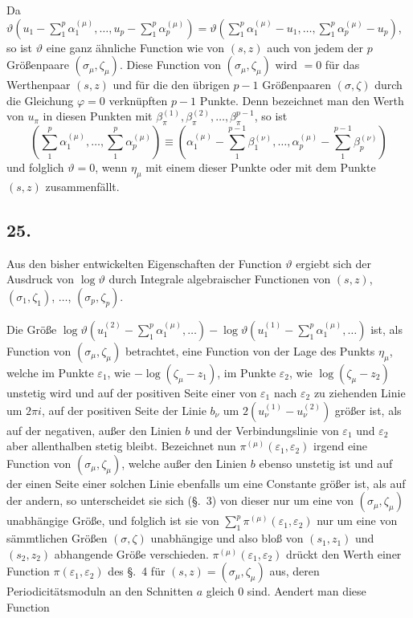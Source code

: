 \documentclass{article}
\begin{document}
Da $\vartheta\left(u_{1} - \displaystyle\sum_{1}^{p} \alpha_{1}^{(\mu)}, \ldots, u_{p} - \sum_{1}^{p} \alpha_{p}^{(\mu)}\right) = \vartheta\left(\displaystyle\sum_{1}^{p} \alpha_{1}^{(\mu)} - u_{1}, \ldots, \sum_{1}^{p} \alpha_{p}^{(\mu)} - u_{p}\right)$, so ist $\vartheta$ eine ganz ähnliche Function wie von $(s, z)$ auch von jedem der $p$ Größenpaare $(\sigma_{\mu}, \zeta_{\mu})$. Diese Function von $(\sigma_{\mu}, \zeta_{\mu})$ wird $= 0$ für das Werthenpaar $(s, z)$ und für die den übrigen $p-1$ Größenpaaren $(\sigma, \zeta)$ durch die Gleichung $\varphi = 0$ verknüpften $p-1$ Punkte. Denn bezeichnet man den Werth von $u_{\pi}$ in diesen Punkten mit $\beta_{\pi}^{(1)}, \beta_{\pi}^{(2)}, \ldots, \beta_{\pi}^{p-1}$, so ist
\[ \left(\sum_{1}^{p} \alpha_{1}^{(\mu)}, \ldots, \sum_{1}^{p} \alpha_{p}^{(\mu)}\right) \equiv \left(\alpha_{1}^{(\mu)} - \sum_{1}^{p-1} \beta_{1}^{(\nu)}, \ldots, \alpha_{p}^{(\mu)} - \sum_{1}^{p-1} \beta_{p}^{(\nu)}\right) \]
und folglich $\vartheta = 0$, wenn $\eta_{\mu}$ mit einem dieser Punkte oder mit dem Punkte $(s, z)$ zusammenfällt.

\subsection*{25.}

Aus den bisher entwickelten Eigenschaften der Function $\vartheta$ ergiebt sich der Ausdruck von $\log\vartheta$ durch Integrale algebraischer Functionen von $(s, z)$, $(\sigma_{1}, \zeta_{1})$, $\ldots$, $(\sigma_{p}, \zeta_{p})$.

Die Größe $\log\vartheta\left(u_{1}^{(2)} - \displaystyle\sum_{1}^{p} \alpha_{1}^{(\mu)}, \ldots\right) - \log\vartheta\left(u_{1}^{(1)} - \displaystyle\sum_{1}^{p} \alpha_{1}^{(\mu)}, \ldots\right)$ ist, als Function von $(\sigma_{\mu}, \zeta_{\mu})$ betrachtet, eine Function von der Lage des Punkts $\eta_{\mu}$, welche im Punkte $\varepsilon_{1}$, wie $-\log(\zeta_{\mu}-z_{1})$, im Punkte $\varepsilon_{2}$, wie $\log(\zeta_{\mu}-z_{2})$ unstetig wird und auf der positiven Seite einer von $\varepsilon_{1}$ nach $\varepsilon_{2}$ zu ziehenden Linie um $2\pi i$, auf der positiven Seite der Linie $b_{\nu}$ um $2(u_{\nu}^{(1)} - u_{\nu}^{(2)})$ größer ist, als auf der negativen, außer den Linien $b$ und der Verbindungslinie von $\varepsilon_{1}$ und $\varepsilon_{2}$ aber allenthalben stetig bleibt. Bezeichnet nun $\pi^{(\mu)}(\varepsilon_{1}, \varepsilon_{2})$ irgend eine Function von $(\sigma_{\mu}, \zeta_{\mu})$, welche außer den Linien $b$ ebenso unstetig ist und auf der einen Seite einer solchen Linie ebenfalls um eine Constante größer ist, als auf der andern, so unterscheidet sie sich (§.~3) von dieser nur um eine von $(\sigma_{\mu}, \zeta_{\mu})$ unabhängige Größe, und folglich ist sie von $\displaystyle\sum_{1}^{p} \pi^{(\mu)}(\varepsilon_{1}, \varepsilon_{2})$ nur um eine von sämmtlichen Größen $(\sigma, \zeta)$ unabhängige und also bloß von $(s_{1}, z_{1})$ und $(s_{2}, z_{2})$ abhangende Größe verschieden. $\pi^{(\mu)}(\varepsilon_{1}, \varepsilon_{2})$ drückt den Werth einer Function $\pi(\varepsilon_{1}, \varepsilon_{2})$ des §.~4 für $(s, z) = (\sigma_{\mu}, \zeta_{\mu})$ aus, deren Periodicitätsmoduln an den Schnitten $a$ gleich 0 sind. Aendert man diese Function
\end{document}
